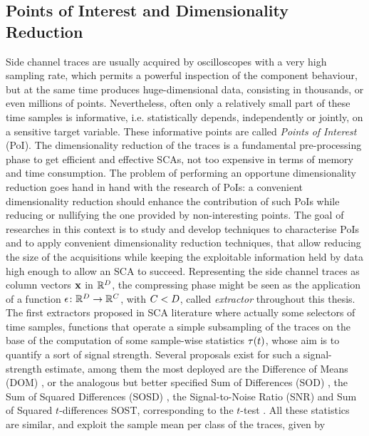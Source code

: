 \subsection{Points of Interest and Dimensionality Reduction}\label{sec:extractors}
Side channel traces are usually acquired by oscilloscopes with a very high sampling rate, which permits a powerful inspection of the component behaviour, but at the same time produces huge-dimensional data, consisting in thousands, or even millions of points. Nevertheless, often only a relatively small part of these time samples is informative, i.e. statistically depends, independently or jointly, on a sensitive target variable. These informative points are called \emph{Points of Interest} (PoI). The dimensionality reduction of the traces is a fundamental pre-processing phase to get efficient and effective SCAs, not too expensive in terms of memory and time consumption. The problem of performing an opportune dimensionality reduction goes hand in hand with the research of PoIs: a convenient dimensionality reduction should enhance the contribution of such PoIs while reducing or nullifying the one provided by non-interesting points. 
The goal of researches in this context is to study and develop techniques to characterise PoIs and to apply convenient dimensionality reduction techniques, that allow reducing the size of the acquisitions while keeping the exploitable information held by data high enough to allow an SCA to succeed.
Representing the side channel traces as column vectors ${\bf x}$ in $\mathbb{R}^D$, the compressing phase might be seen as the application of a function $\epsilon\colon \mathbb{R}^D\rightarrow \mathbb{R}^C$, with $C<D$, called {\em extractor} throughout this thesis. The first extractors proposed in SCA literature where actually some selectors of time samples, \ie functions that operate a simple subsampling of the traces on the base of the computation of some sample-wise statistics $\tau(t)$, whose aim is to quantify a sort of  signal strength. Several proposals exist for such a signal-strength estimate, among them the most deployed are the Difference of Means (DOM) \cite{Chari2003}, or the analogous but better specified Sum of Differences (SOD) \cite{Rechberger2005}, the Sum of Squared Differences (SOSD) \cite{gierlichs2006templates}, the Signal-to-Noise Ratio (SNR) \cite{mangard2008power,lomne2013behind} and  Sum of Squared $t$-differences SOST, corresponding to the $t$-test \cite{gierlichs2006templates}. All these statistics are similar, and exploit the sample mean per class of the traces, given by
